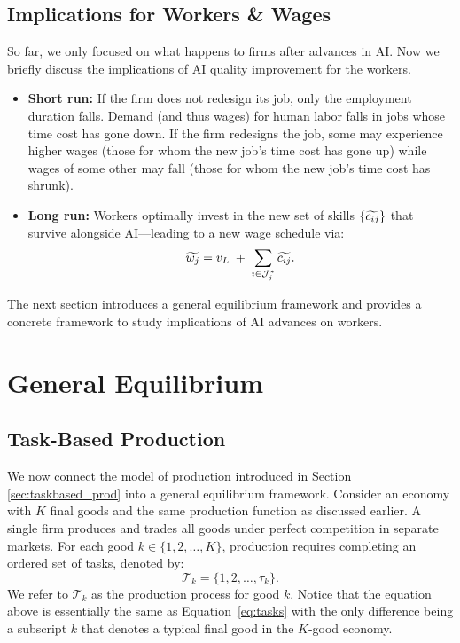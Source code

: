 \documentclass{article}
\theoremstyle{plain}
\theoremstyle{plain}
\begin{document}
\subsection{Implications for Workers \& Wages}

So far, we only focused on what happens to firms after advances in AI. 
Now we briefly discuss the implications of AI quality improvement for the workers.

\begin{itemize}
  \item {\bf Short run:}  If the firm does not redesign its job, only the employment duration falls. Demand (and thus wages) for human labor falls in jobs whose time cost has gone down. If the firm redesigns the job, some may experience higher wages (those for whom the new job's time cost has gone up) while wages of some other may fall (those for whom the new job's time cost has shrunk).
  \item {\bf Long run:}  Workers optimally invest in the new set of skills \(\{\widetilde{c_{ij}}\}\) that survive alongside AI---leading to a new wage schedule via:
  \[
    \widetilde{w_j}
    = v_L \;+\;\sum_{i\in\mathcal{J}_j^*} \widetilde{c_{ij}}.
  \]
\end{itemize}
The next section introduces a general equilibrium framework and provides a concrete framework to study implications of AI advances on workers.




\section{General Equilibrium}
\label{sec:GE}

\subsection{Task-Based Production}
\label{sec:prod_GE}

We now connect the model of production introduced in Section \ref{sec:taskbased_prod} into a general equilibrium framework.
Consider an economy with $K$ final goods and the same production function as discussed earlier.
A single firm produces and trades all goods under perfect competition in separate markets.
For each good $k \in \{1, 2,\ldots,K\}$, production requires completing an ordered set of tasks, denoted by:
\[
\mathcal{T}_k = \{1,2,\ldots,\tau_k\}.
\]
We refer to $\mathcal{T}_k$ as the production process for good $k$.
Notice that the equation above is essentially the same as Equation~\ref{eq:tasks} with the only difference being a subscript $k$ that denotes a typical final good in the $K$-good economy.
\end{document}
